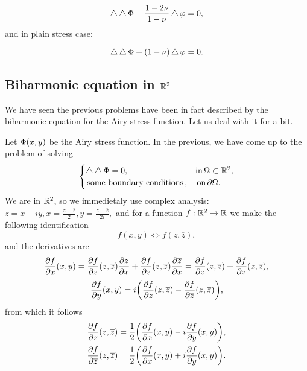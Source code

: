 \documentclass[../main.tex]{subfiles}
\begin{document}
\[
	\operatorname{\bigtriangleup} \operatorname{\bigtriangleup} \Phi + \frac{1-2 \nu}{1-\nu}\operatorname{\bigtriangleup} \varphi = 0,
\]
and in plain stress case:

\[
	\operatorname{\bigtriangleup} \operatorname{\bigtriangleup} \Phi + \qty(1- \nu)\operatorname{\bigtriangleup} \varphi = 0.
\]

\subsection{Biharmonic equation in ${\mathbb R}^2$}
\label{sec:biharmonic}
We have seen the previous problems have been in fact described by the biharmonic equation for the Airy stress function. Let us deal with it for a bit.

Let $\Phi\qty(x,y)$ be the Airy stress function. In the previous, we have come up to the problem of solving
\[
	\begin{cases}\operatorname{\bigtriangleup} \operatorname{\bigtriangleup} \Phi = 0, \, &\text{in} \, \Omega \subset {\mathbb R}^2,\\
	\, \text{some boundary conditions} \,, &\, \text{on} \, \partial  \Omega.\end{cases}
\]
We are in ${\mathbb R}^2$, so we immedietaly use complex analysis: $z = x+iy, x = \frac{z+\overline{z}}{2}, y = \frac{z-\overline{z}}{2i},$ and for a function $f: {\mathbb R}^2 \to {\mathbb R}$ we make the following identification
\[
	f(x,y) \Leftrightarrow f(z,\overline{z}),
\]
and the derivatives are
\[
	\pdv{f}{x}\qty(x,y) = \pdv{f}{z}\qty(z,\overline{z})\pdv{z}{x}+\pdv{f}{z}\qty(z,\overline{z})\pdv{\overline{z}}{x} = \pdv{f}{z}\qty(z,\overline{z})+\pdv{f}{z}\qty(z,\overline{z}),
\]
\[
	\pdv{f}{y}\qty(x,y) = i\qty(\pdv{f}{z}\qty(z,\overline{z})-\pdv{f}{\overline{z}}\qty(z,\overline{z})),
\]
from which it follows
\begin{align*}
	\pdv{f}{z}\qty(z,\overline{z}) &= \frac{1}{2}\qty(\pdv{f}{x}\qty(x,y)-i \pdv{f}{y}\qty(x,y)), \\
	\pdv{f}{\overline{z}}\qty(z,\overline{z}) &= \frac{1}{2}\qty(\pdv{f}{x}\qty(x,y)+i \pdv{f}{y}\qty(x,y)).
\end{align*}
\end{document}
